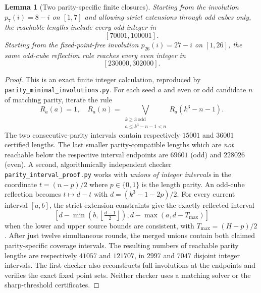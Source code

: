 \documentclass[10pt]{article}
\newtheorem{lemma}{Lemma}
\begin{document}
\begin{lemma}[Two parity-specific finite closures]
\label{lem:parity-closures}
Starting from the involution
$p_7(i)=8-i$ on $[1,7]$ and allowing
strict extensions through \emph{odd}
cubes only, the reachable lengths
include \emph{every odd integer}
in
\[
\boxed{[70001,100001].}
\]
Starting from the fixed-point-free
involution $p_{26}(i)=27-i$
on $[1,26]$, the same odd-cube
reflection rule reaches \emph{every
even integer} in
\[
\boxed{[230000,302000].}
\]
\end{lemma}
\begin{proof}
This is an exact finite integer
calculation, reproduced by
\texttt{parity\_minimal\_involutions.py}.
For each seed $a$ and even or odd
candidate $n$ of matching parity,
iterate the rule
\[
R_a(a)=1,\quad
R_a(n)=
\bigvee_{\substack{k\ge3\ \mathrm{odd}\\
a\le k^3-n-1<n}}
R_a(k^3-n-1).
\]
The two consecutive-parity intervals
contain respectively $15001$
and $36001$ certified lengths.
The last smaller parity-compatible
lengths which are \emph{not} reachable
below the respective interval
endpoints are $69601$ (odd)
and $228026$ (even).
A second, algorithmically
independent checker
\texttt{parity\_interval\_proof.py}
works with \emph{unions of integer
intervals} in the coordinate
$t=(n-p)/2$ where $p\in\{0,1\}$
is the length parity. An odd-cube
reflection becomes $t\mapsto d-t$
with $d=(k^3-1-2p)/2$.
For every current interval $[a,b]$,
the strict-extension constraints
give the exactly reflected interval
\[
\left[d-\min\left(b,
\left\lfloor\tfrac{d-1}{2}\right\rfloor\right),
d-\max(a,d-T_{\max})\right]
\]
when the lower and upper source
bounds are consistent, with
$T_{\max}=(H-p)/2$.
After just twelve simultaneous
rounds, the merged unions contain
both claimed parity-specific
coverage intervals. The resulting
numbers of reachable parity lengths
are respectively $41057$ and
$121707$, in $2997$ and $7047$
disjoint integer intervals.
The first checker also reconstructs
full involutions at the endpoints
and verifies the exact fixed
point sets. Neither checker uses
a matching solver or the
sharp-threshold certificates.
\end{proof}
\end{document}
